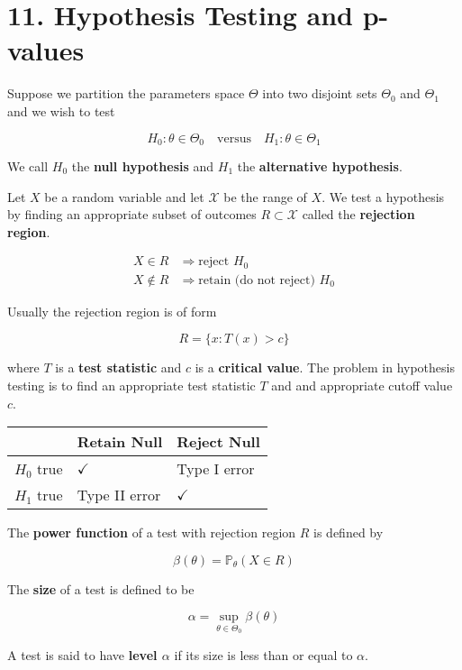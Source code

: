 \section{11. Hypothesis Testing and p-values}\label{hypothesis-testing-and-p-values}

Suppose we partition the parameters space \(\Theta\) into two disjoint
sets \(\Theta_0\) and \(\Theta_1\) and we wish to test

\[
H_0: \theta \in \Theta_0
\quad \text{versus} \quad
H_1: \theta \in \Theta_1
\]

We call \(H_0\) the \textbf{null hypothesis} and \(H_1\) the
\textbf{alternative hypothesis}.

Let \(X\) be a random variable and let \(\mathcal{X}\) be the range of
\(X\). We test a hypothesis by finding an appropriate subset of outcomes
\(R \subset \mathcal{X}\) called the \textbf{rejection region}.

\begin{align}
X \in R & \Longrightarrow  \text{reject } H_0 \\
X \notin R & \Longrightarrow  \text{retain (do not reject) } H_0
\end{align}

Usually the rejection region is of form

\[ R = \bigg\{x: T(x) > c \bigg\}\]

where \(T\) is a \textbf{test statistic} and \(c\) is a \textbf{critical
value}. The problem in hypothesis testing is to find an appropriate test
statistic \(T\) and and appropriate cutoff value \(c\).

\begin{longtable}[]{@{}lll@{}}
\toprule\noalign{}
& Retain Null & Reject Null \\
\midrule\noalign{}
\endhead
\bottomrule\noalign{}
\endlastfoot
\(H_0\) true & \(\checkmark\) & Type I error \\
\(H_1\) true & Type II error & \(\checkmark\) \\
\end{longtable}

The \textbf{power function} of a test with rejection region \(R\) is
defined by

\[\beta(\theta) = \mathbb{P}_\theta(X \in R)\]

The \textbf{size} of a test is defined to be

\[\alpha = \sup_{\theta \in \Theta_0} \beta(\theta)\]

A test is said to have \textbf{level \(\alpha\)} if its size is less
than or equal to \(\alpha\).

